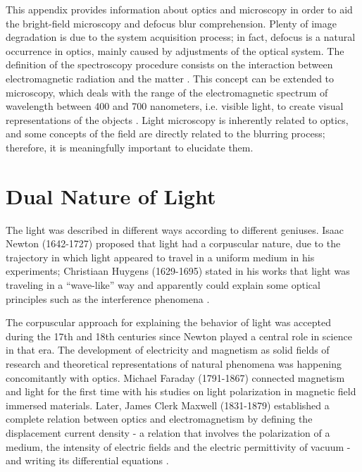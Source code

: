 This appendix provides information about optics and microscopy in order to aid the bright-field microscopy and defocus blur comprehension. Plenty of image degradation is due to the system acquisition process; in fact, defocus is a natural occurrence in optics, mainly caused by adjustments of the optical system. The definition of the spectroscopy procedure consists on the interaction between electromagnetic radiation and the matter \cite{gauglitz2006handbook}. This concept can be extended to microscopy, which deals with the range of the electromagnetic spectrum of wavelength between 400 and 700 nanometers, i.e. visible light, to create visual representations of the objects \cite{bell2009introduction}. Light microscopy is inherently related to optics, and some concepts of the field are directly related to the blurring process; therefore, it is meaningfully important to elucidate them.

\section{Dual Nature of Light}

The light was described in different ways according to different geniuses. Isaac Newton (1642-1727) proposed that light had a corpuscular nature, due to the trajectory in which light appeared to travel in a uniform medium in his experiments; Christiaan Huygens (1629-1695) stated in his works that light was traveling in a ``wave-like'' way and apparently could explain some optical principles such as the interference phenomena \cite{fowles1989introduction}. 

The corpuscular approach for explaining the behavior of light was accepted during the 17th and 18th centuries since Newton played a central role in science in that era. The development of electricity and magnetism as solid fields of research and theoretical representations of natural phenomena was happening concomitantly with optics. Michael Faraday (1791-1867) connected magnetism and light for the first time with his studies on light polarization in magnetic field immersed materials. Later, James Clerk Maxwell (1831-1879) established a complete relation between optics and electromagnetism by defining the displacement current density - a relation that involves the polarization of a medium, the intensity of electric fields and the electric permittivity of vacuum - and writing its differential equations \cite{zilio2009optica}.

